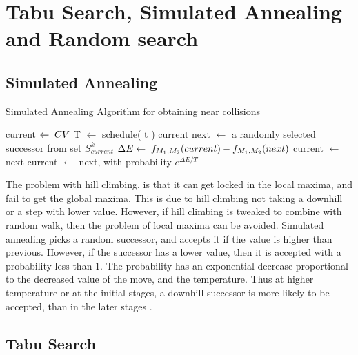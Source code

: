 \section{Tabu Search, Simulated Annealing and Random search}

\subsection{Simulated Annealing}

\begin{algorithm}
  \caption{ Simulated Annealing Algorithm for obtaining near collisions }
  \begin{algorithmic}[1]
      \State current $\gets \thickspace CV$
        \State T $\gets$ schedule( t )
          \State \Return current
        \EndIf
        \State next $\gets$ a randomly selected successor from set $S^{k}_{current}$
        \State $\Delta E \gets  \thickspace f_{M_{1}, M_{2}}(current) - f_{M_{1}, M_{2}}(next)$
          \State current $\gets$ next
        \Else
          \State current $\gets$ next, with probability $e^{\Delta E / T}$
        \EndIf
      \EndFor
    \EndFunction
  \end{algorithmic}
\end{algorithm}

The problem with hill climbing, is that it can get locked in the local maxima, and fail to get the global maxima.
This is due to hill climbing not taking a downhill or a step with lower value. However, if hill climbing is 
tweaked to combine with random walk, then the problem of local maxima can be avoided. Simulated annealing picks
a random successor, and accepts it if the value is higher than previous. However, if the successor has a lower
value, then it is accepted with a probability less than 1. The probability has an exponential decrease proportional
to the decreased value of the move, and the temperature. Thus at higher temperature or at the initial stages, a
downhill successor is more likely to be accepted, than in the later stages \cite{00033}.

\subsection{Tabu Search}

